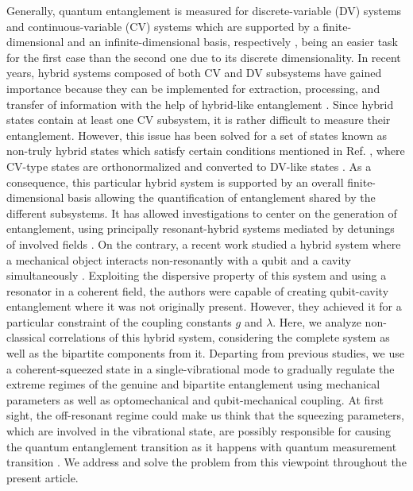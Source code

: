 Generally, quantum entanglement is measured for discrete-variable (DV) systems and continuous-variable (CV) systems which are supported by a finite-dimensional and an infinite-dimensional basis, respectively \cite{wang2001continuous, van2011optical, spagnolo2011hybrid}, being an easier task for the first case than the second one due to its discrete dimensionality. In recent years, hybrid systems composed of both CV and DV subsystems have gained importance because they can be implemented for extraction, processing, and transfer of information with the help of hybrid-like entanglement \cite{kurizki2015quantum, lorenz2004continuous, van2008hybrid}. Since hybrid states contain at least one CV subsystem, it is rather difficult to measure their entanglement. However, this issue has been solved for a set of states known as non-truly hybrid states which satisfy certain conditions mentioned in Ref. \cite{kreis2012classifying}, where CV-type states are orthonormalized and converted to DV-like states \cite{nielsen2000chuang}. As a consequence, this particular hybrid system is supported by an overall finite-dimensional basis allowing the quantification of entanglement shared by the different subsystems. It has allowed investigations to center on the generation of entanglement, using principally resonant-hybrid systems mediated by detunings of involved fields \cite{stannigel2010optomechanical, stannigel2011optomechanical, habraken2012continuous}. On the contrary, a recent work studied a hybrid system where a mechanical object interacts non-resonantly with a qubit and a cavity simultaneously \cite{montenegro2019mechanical}. Exploiting the dispersive property of this system and using a resonator in a coherent field, the authors were capable of creating qubit-cavity entanglement where it was not originally present. However, they achieved it for a particular constraint of the coupling constants $g$ and $\lambda$. Here, we analyze non-classical correlations of this hybrid system, considering the complete system as well as the bipartite components from it. Departing from previous studies, we use a coherent-squeezed state in a single-vibrational mode to gradually regulate the extreme regimes of the genuine and bipartite entanglement using mechanical parameters as well as optomechanical and qubit-mechanical coupling. At first sight, the off-resonant regime could make us think that the squeezing parameters, which are involved in the vibrational state, are possibly responsible for causing the quantum entanglement transition as it happens with quantum measurement transition \cite{araya2021influence, pan2020weak, turek2022general}. We address and solve the problem from this viewpoint throughout the present article.

